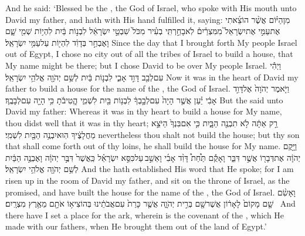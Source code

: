 {And he said: ‘Blessed be the \lord, the God of Israel, who spoke with His mouth unto David my father, and hath with His hand fulfilled it, saying:}
{מִן\maqqaf הַיּ֗וֹם אֲשֶׁ֨ר הוֹצֵ֜אתִי אֶת\maqqaf עַמִּ֣י אֶת\maqqaf יִשְׂרָאֵל֮ מִמִּצְרַ֒יִם֒ לֹֽא\maqqaf בָחַ֣רְתִּֽי בְעִ֗יר מִכֹּל֙ שִׁבְטֵ֣י יִשְׂרָאֵ֔ל לִבְנ֣וֹת בַּ֔יִת לִהְי֥וֹת שְׁמִ֖י שָׁ֑ם וָאֶבְחַ֣ר בְּדָוִ֔ד לִהְי֖וֹת עַל\maqqaf עַמִּ֥י יִשְׂרָאֵֽל׃}
{Since the day that I brought forth My people Israel out of Egypt, I chose no city out of all the tribes of Israel to build a house, that My name might be there; but I chose David to be over My people Israel.}
{וַיְהִ֕י עִם\maqqaf לְבַ֖ב דָּוִ֣ד אָבִ֑י לִבְנ֣וֹת בַּ֔יִת לְשֵׁ֥ם יְהֹוָ֖ה אֱלֹהֵ֥י יִשְׂרָאֵֽל׃}
{Now it was in the heart of David my father to build a house for the name of the \lord, the God of Israel.}
{וַיֹּ֤אמֶר יְהֹוָה֙ אֶל\maqqaf דָּוִ֣ד אָבִ֔י יַ֗עַן אֲשֶׁ֤ר הָיָה֙ עִם\maqqaf לְבָ֣בְךָ֔ לִבְנ֥וֹת בַּ֖יִת לִשְׁמִ֑י הֱֽטִיבֹ֔תָ כִּ֥י הָיָ֖ה עִם\maqqaf לְבָבֶֽךָ׃}
{But the \lord\space said unto David my father: Whereas it was in thy heart to build a house for My name, thou didst well that it was in thy heart;}
{רַ֣ק אַתָּ֔ה לֹ֥א תִבְנֶ֖ה הַבָּ֑יִת כִּ֤י אִם\maqqaf בִּנְךָ֙ הַיֹּצֵ֣א מֵחֲלָצֶ֔יךָ הֽוּא\maqqaf יִבְנֶ֥ה הַבַּ֖יִת לִשְׁמִֽי׃}
{nevertheless thou shalt not build the house; but thy son that shall come forth out of thy loins, he shall build the house for My name.}
{וַיָּ֣קֶם יְהֹוָ֔ה אֶת\maqqaf דְּבָר֖וֹ אֲשֶׁ֣ר דִּבֵּ֑ר וָאָקֻ֡ם תַּ֩חַת֩ דָּוִ֨ד אָבִ֜י וָאֵשֵׁ֣ב \legarmeh  עַל\maqqaf כִּסֵּ֣א יִשְׂרָאֵ֗ל כַּֽאֲשֶׁר֙ דִּבֶּ֣ר יְהֹוָ֔ה וָאֶבְנֶ֣ה הַבַּ֔יִת לְשֵׁ֥ם יְהֹוָ֖ה אֱלֹהֵ֥י יִשְׂרָאֵֽל׃}
{And the \lord\space hath established His word that He spoke; for I am risen up in the room of David my father, and sit on the throne of Israel, as the \lord\space promised, and have built the house for the name of the \lord, the God of Israel.}
{וָאָשִׂ֨ם שָׁ֤ם מָקוֹם֙ לָאָר֔וֹן אֲשֶׁר\maqqaf שָׁ֖ם בְּרִ֣ית יְהֹוָ֑ה אֲשֶׁ֤ר כָּרַת֙ עִם\maqqaf אֲבֹתֵ֔ינוּ בְּהוֹצִיא֥וֹ אֹתָ֖ם מֵאֶ֥רֶץ מִצְרָֽיִם׃ \setuma }
{And there have I set a place for the ark, wherein is the covenant of the \lord, which He made with our fathers, when He brought them out of the land of Egypt.’}
\newperek

